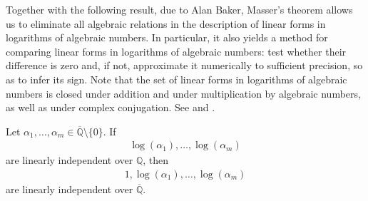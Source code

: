 
Together with the following result, due to Alan Baker, Masser's theorem allows us to eliminate all algebraic relations in the description of linear forms in logarithms of algebraic numbers. In particular, it also yields a method for comparing linear forms in logarithms of algebraic numbers: test whether their difference is zero and, if not, approximate it numerically to sufficient precision, so as to infer its sign. Note that the set of linear forms in logarithms of algebraic numbers is closed under addition and under multiplication by algebraic numbers, as well as under complex conjugation. See \cite{Baker75} and \cite{BakerPaper}.

\begin{theorem}[Baker]
Let $\alpha_{1}, \ldots, \alpha_{m} \in \overline{\mathbb{Q}} \setminus \lbrace 0 \rbrace$. If
\begin{align*}
\log(\alpha_{1}), \ldots, \log(\alpha_{m})
\end{align*}
are linearly independent over $\mathbb{Q}$, then
\begin{align*}
1, \log(\alpha_{1}), \ldots, \log(\alpha_{m})
\end{align*}
are linearly independent over $\overline{\mathbb{Q}}$.
\end{theorem}



